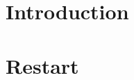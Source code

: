 \documentclass{article}
\begin{document}
\maketitle

\section{Introduction}


\section{Restart}





\end{document}
